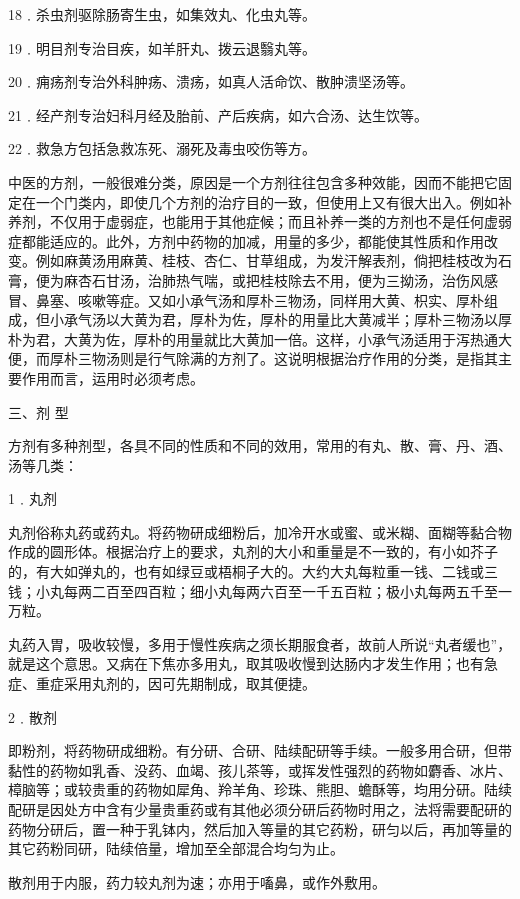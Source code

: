 \documentclass[a4paper,12pt,UTF8,twoside]{ctexbook}
\begin{document}
18﹒杀虫剂驱除肠寄生虫，如集效丸、化虫丸等。

19﹒明目剂专治目疾，如羊肝丸、拨云退翳丸等。

20﹒痈疡剂专治外科肿疡、溃疡，如真人活命饮、散肿溃坚汤等。

21﹒经产剂专治妇科月经及胎前、产后疾病，如六合汤、达生饮等。

22﹒救急方包括急救冻死、溺死及毒虫咬伤等方。

中医的方剂，一般很难分类，原因是一个方剂往往包含多种效能，因而不能把它固定在一个门类内，即使几个方剂的治疗目的一致，但使用上又有很大出入。例如补养剂，不仅用于虚弱症，也能用于其他症候；而且补养一类的方剂也不是任何虚弱症都能适应的。此外，方剂中药物的加减，用量的多少，都能使其性质和作用改变。例如麻黄汤用麻黄、桂枝、杏仁、甘草组成，为发汗解表剂，倘把桂枝改为石膏，便为麻杏石甘汤，治肺热气喘，或把桂枝除去不用，便为三拗汤，治伤风感冒、鼻塞、咳嗽等症。又如小承气汤和厚朴三物汤，同样用大黄、枳实、厚朴组成，但小承气汤以大黄为君，厚朴为佐，厚朴的用量比大黄减半；厚朴三物汤以厚朴为君，大黄为佐，厚朴的用量就比大黄加一倍。这样，小承气汤适用于泻热通大便，而厚朴三物汤则是行气除满的方剂了。这说明根据治疗作用的分类，是指其主要作用而言，运用时必须考虑。

三、剂 型

方剂有多种剂型，各具不同的性质和不同的效用，常用的有丸、散、膏、丹、酒、汤等几类：

1﹒丸剂

丸剂俗称丸药或药丸。将药物研成细粉后，加冷开水或蜜、或米糊、面糊等黏合物作成的圆形体。根据治疗上的要求，丸剂的大小和重量是不一致的，有小如芥子的，有大如弹丸的，也有如绿豆或梧桐子大的。大约大丸每粒重一钱、二钱或三钱；小丸每两二百至四百粒；细小丸每两六百至一千五百粒；极小丸每两五千至一万粒。

丸药入胃，吸收较慢，多用于慢性疾病之须长期服食者，故前人所说“丸者缓也”，就是这个意思。又病在下焦亦多用丸，取其吸收慢到达肠内才发生作用；也有急症、重症采用丸剂的，因可先期制成，取其便捷。

2﹒散剂

即粉剂，将药物研成细粉。有分研、合研、陆续配研等手续。一般多用合研，但带黏性的药物如乳香、没药、血竭、孩儿茶等，或挥发性强烈的药物如麝香、冰片、樟脑等；或较贵重的药物如犀角、羚羊角、珍珠、熊胆、蟾酥等，均用分研。陆续配研是因处方中含有少量贵重药或有其他必须分研后药物时用之，法将需要配研的药物分研后，置一种于乳钵内，然后加入等量的其它药粉，研匀以后，再加等量的其它药粉同研，陆续倍量，增加至全部混合均匀为止。

散剂用于内服，药力较丸剂为速；亦用于㗜鼻，或作外敷用。
\end{document}

